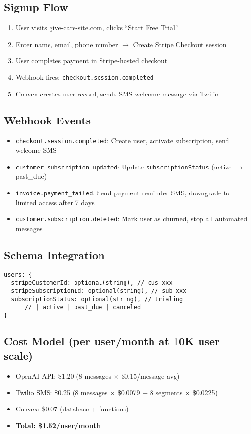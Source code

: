 \documentclass{article}
\begin{document}
\subsection*{Signup Flow}
\begin{enumerate}
    \item User visits give-care-site.com, clicks ``Start Free Trial''
    \item Enter name, email, phone number $\rightarrow$ Create Stripe Checkout session
    \item User completes payment in Stripe-hosted checkout
    \item Webhook fires: \texttt{checkout.session.completed}
    \item Convex creates user record, sends SMS welcome message via Twilio
\end{enumerate}

\subsection*{Webhook Events}
\begin{itemize}
    \item \texttt{checkout.session.completed}: Create user, activate subscription, send welcome SMS
    \item \texttt{customer.subscription.updated}: Update \texttt{subscriptionStatus} (active $\rightarrow$ past\_due)
    \item \texttt{invoice.payment\_failed}: Send payment reminder SMS, downgrade to limited access after 7 days
    \item \texttt{customer.subscription.deleted}: Mark user as churned, stop all automated messages
\end{itemize}

\subsection*{Schema Integration}
\begin{verbatim}
users: {
  stripeCustomerId: optional(string), // cus_xxx
  stripeSubscriptionId: optional(string), // sub_xxx
  subscriptionStatus: optional(string), // trialing
      // | active | past_due | canceled
}
\end{verbatim}

\subsection*{Cost Model (per user/month at 10K user scale)}
\begin{itemize}
    \item OpenAI API: \$1.20 (8 messages $\times$ \$0.15/message avg)
    \item Twilio SMS: \$0.25 (8 messages $\times$ \$0.0079 + 8 segments $\times$ \$0.0225)
    \item Convex: \$0.07 (database + functions)
    \item \textbf{Total: \$1.52/user/month}
\end{itemize}
\end{document}

